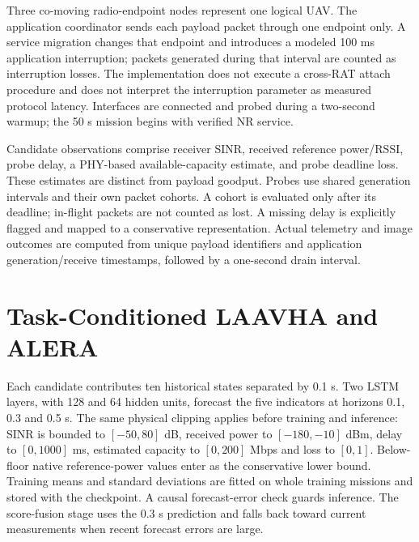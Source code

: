\documentclass[preprint,12pt]{elsarticle}
\begin{document}
Three co-moving radio-endpoint nodes represent one logical UAV. The application coordinator sends each payload packet through one endpoint only. A service migration changes that endpoint and introduces a modeled 100 ms application interruption; packets generated during that interval are counted as interruption losses. The implementation does not execute a cross-RAT attach procedure and does not interpret the interruption parameter as measured protocol latency. Interfaces are connected and probed during a two-second warmup; the 50 s mission begins with verified NR service.

Candidate observations comprise receiver SINR, received reference power/RSSI, probe delay, a PHY-based available-capacity estimate, and probe deadline loss. These estimates are distinct from payload goodput. Probes use shared generation intervals and their own packet cohorts. A cohort is evaluated only after its deadline; in-flight packets are not counted as lost. A missing delay is explicitly flagged and mapped to a conservative representation. Actual telemetry and image outcomes are computed from unique payload identifiers and application generation/receive timestamps, followed by a one-second drain interval.

\section{Task-Conditioned LAAVHA and ALERA}\label{sec:laavha}
Each candidate contributes ten historical states separated by 0.1 s. Two LSTM layers, with 128 and 64 hidden units, forecast the five indicators at horizons 0.1, 0.3 and 0.5 s. The same physical clipping applies before training and inference: SINR is bounded to $[-50,80]$ dB, received power to $[-180,-10]$ dBm, delay to $[0,1000]$ ms, estimated capacity to $[0,200]$ Mbps and loss to $[0,1]$. Below-floor native reference-power values enter as the conservative lower bound. Training means and standard deviations are fitted on whole training missions and stored with the checkpoint. A causal forecast-error check guards inference. The score-fusion stage uses the 0.3 s prediction and falls back toward current measurements when recent forecast errors are large.
\end{document}
